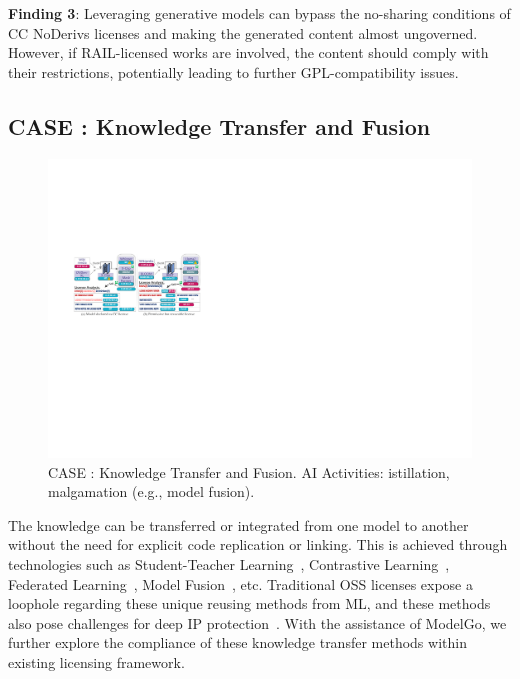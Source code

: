 \begin{tcolorbox} 
\textbf{Finding 3}: Leveraging generative models can bypass the no-sharing conditions of CC NoDerivs licenses and making the generated content almost ungoverned.
However, if RAIL-licensed works are involved, the content should comply with their restrictions, potentially leading to further GPL-compatibility issues.
\end{tcolorbox}

\subsection{CASE  : Knowledge Transfer and Fusion}

\begin{figure}[h]
    \centering
    \includegraphics[width=\linewidth]{fig/case4.pdf}
    \caption{CASE : Knowledge Transfer and Fusion.  AI Activities: istillation, malgamation (e.g., model fusion).}
    \Description{}
    \label{fig:case4}
\end{figure}

The knowledge can be transferred or integrated from one model to another without the need for explicit code replication or linking. 
This is achieved through technologies such as Student-Teacher Learning~\cite{furlanello2018born}, Contrastive Learning~\cite{li2021model}, Federated Learning~\cite{mcmahan2017communication}, Model Fusion~\cite{lam2021model}, etc.
Traditional OSS licenses expose a loophole regarding these unique reusing methods from ML, and these methods also pose challenges for deep IP protection~\cite{peng2022intellectual}.
With the assistance of ModelGo, we further explore the compliance of these knowledge transfer methods within existing licensing framework.

